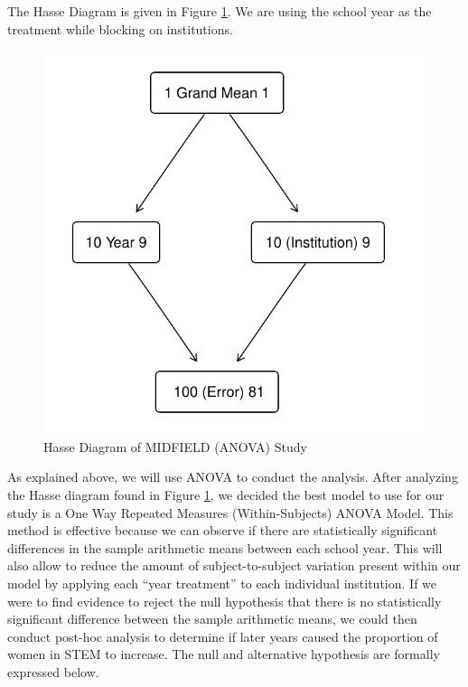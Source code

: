 \documentclass[]{article}
\begin{document}
The Hasse Diagram is given in Figure \ref{fig:hasse}. We are using the
school year as the treatment while blocking on institutions.

\begin{figure}

{\centering \includegraphics{Stat_461_Final_Project_Report_files/figure-latex/hasse-1} 

}

\caption{Hasse Diagram of MIDFIELD (ANOVA) Study}\label{fig:hasse}
\end{figure}

As explained above, we will use ANOVA to conduct the analysis. After
analyzing the Hasse diagram found in Figure \ref{fig:hasse}, we decided
the best model to use for our study is a One Way Repeated Measures
(Within-Subjects) ANOVA Model. This method is effective because we can
observe if there are statistically significant differences in the sample
arithmetic means between each school year. This will also allow to
reduce the amount of subject-to-subject variation present within our
model by applying each ``year treatment'' to each individual
institution. If we were to find evidence to reject the null hypothesis
that there is no statistically significant difference between the sample
arithmetic means, we could then conduct post-hoc analysis to determine
if later years caused the proportion of women in STEM to increase. The
null and alternative hypothesis are formally expressed below.
\end{document}
